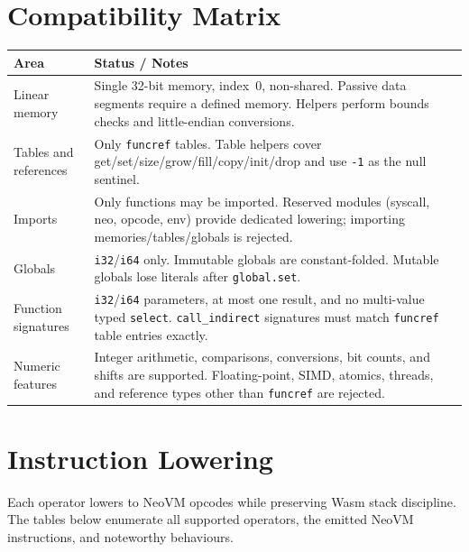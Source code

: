 \documentclass[11pt]{article}
\begin{document}
\section{Compatibility Matrix}
\begin{table}[htbp]
\centering
\begin{tabular}{@{}p{3.6cm}p{9.4cm}@{}}
\toprule
Area & Status / Notes \\
\midrule
Linear memory & Single 32-bit memory, index~0, non-shared. Passive data segments require a defined memory. Helpers perform bounds checks and little-endian conversions. \\
Tables and references & Only \texttt{funcref} tables. Table helpers cover get/set/size/grow/fill/copy/init/drop and use \texttt{-1} as the null sentinel. \\
Imports & Only functions may be imported. Reserved modules (syscall, neo, opcode, env) provide dedicated lowering; importing memories/tables/globals is rejected. \\
Globals & \texttt{i32}/\texttt{i64} only. Immutable globals are constant-folded. Mutable globals lose literals after \texttt{global.set}. \\
Function signatures & \texttt{i32}/\texttt{i64} parameters, at most one result, and no multi-value typed \texttt{select}. \texttt{call\_indirect} signatures must match \texttt{funcref} table entries exactly. \\
Numeric features & Integer arithmetic, comparisons, conversions, bit counts, and shifts are supported. Floating-point, SIMD, atomics, threads, and reference types other than \texttt{funcref} are rejected. \\
\bottomrule
\end{tabular}
\end{table}

\section{Instruction Lowering}
Each operator lowers to NeoVM opcodes while preserving Wasm stack discipline. The tables below enumerate all supported operators, the emitted NeoVM instructions, and noteworthy behaviours.
\end{document}
